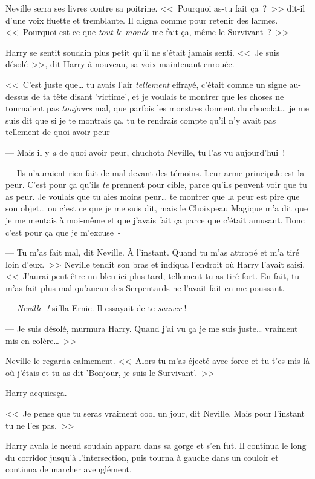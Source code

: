 Neville serra ses livres contre sa poitrine. <<~Pourquoi as-tu fait ça~?~>> dit-il d'une voix fluette et tremblante. Il cligna comme pour retenir des larmes. <<~Pourquoi est-ce que \emph{tout le monde} me fait ça, même le Survivant~?~>>

Harry se sentit soudain plus petit qu'il ne s'était jamais senti. <<~Je suis désolé~>>, dit Harry à nouveau, sa voix maintenant enrouée.

<<~C'est juste que… tu avais l'air \emph{tellement} effrayé, c'était comme un signe au-dessus de ta tête disant 'victime', et je voulais te montrer que les choses ne tournaient pas \emph{toujours} mal, que parfois les monstres donnent du chocolat… je me suis dit que si je te montrais ça, tu te rendrais compte qu'il n'y avait pas tellement de quoi avoir peur~-

--- Mais il y \emph{a} de quoi avoir peur, chuchota Neville, tu l'as vu aujourd'hui~!

--- Ils n'auraient rien fait de mal devant des témoins. Leur arme principale est la peur. C'est pour ça qu'ils \emph{te} prennent pour cible, parce qu'ils peuvent voir que tu as peur. Je voulais que tu aies moins peur… te montrer que la peur est pire que son objet… ou c'est ce que je me suis dit, mais le Choixpeau Magique m'a dit que je me mentais à moi-même et que j'avais fait ça parce que c'était amusant. Donc c'est pour ça que je m'excuse~-

--- Tu m'as fait mal, dit Neville. À l'instant. Quand tu m'as attrapé et m'a tiré loin d'eux.~>> Neville tendit son bras et indiqua l'endroit où Harry l'avait saisi. <<~J'aurai peut-être un bleu ici plus tard, tellement tu as tiré fort. En fait, tu m'as fait plus mal qu'aucun des Serpentards ne l'avait fait en me poussant.

--- \emph{Neville~!} siffla Ernie. Il essayait de te \emph{sauver} !

--- Je suis désolé, murmura Harry. Quand j'ai vu ça je me suis juste… vraiment mis en colère…~>>

Neville le regarda calmement. <<~Alors tu m'as éjecté avec force et tu t'es mis là où j'étais et tu as dit 'Bonjour, je suis le Survivant'.~>>

Harry acquiesça.

<<~Je pense que tu seras vraiment cool un jour, dit Neville. Mais pour l'instant tu ne l'es pas.~>>

Harry avala le nœud soudain apparu dans sa gorge et s'en fut. Il continua le long du corridor jusqu'à l'intersection, puis tourna à gauche dans un couloir et continua de marcher aveuglément.

